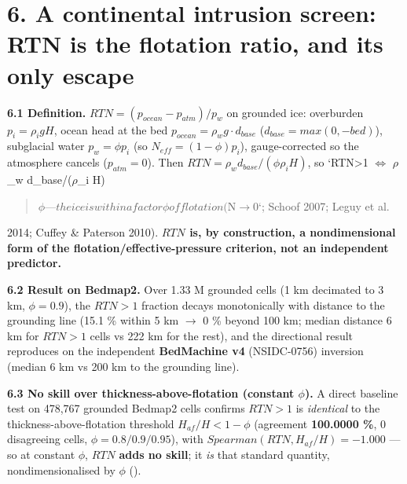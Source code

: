 \documentclass[11pt]{article}
\begin{document}
\section*{6. A continental intrusion screen: RTN is the flotation ratio, and its only escape}


\textbf{6.1 Definition.} $RTN = (p_{ocean} - p_{atm})/p_{w}$ on grounded ice: overburden $p_{i}=\rho _{i} g H$, ocean head at the bed $p_{ocean}=\rho _{w} g\cdot d_{base}$ ($d_{base}=max(0,-bed)$), subglacial water $p_{w}=\phi  p_{i}$ (so $N_{eff}=(1-\phi )p_{i}$), gauge-corrected so the atmosphere cancels ($p_{atm}=0$). Then $RTN = \rho _{w} d_{base}/(\phi  \rho _{i} H)$, so `RTN>1 \ensuremath{\iff} \ensuremath{\rho}\_w d\_base/(\ensuremath{\rho}\_i H)

\begin{quote}
\ensuremath{\phi}$ — the ice is within a factor $\ensuremath{\phi}$ of flotation ($N\ensuremath{\to}0`; Schoof 2007; Leguy et al.
\end{quote}

2014; Cuffey \& Paterson 2010). \textbf{$RTN$ is, by construction, a nondimensional form of the flotation/effective-pressure criterion, not an independent predictor.}


\textbf{6.2 Result on Bedmap2.} Over 1.33 M grounded cells (1 km decimated to 3 km, $\phi =0.9$), the $RTN>1$ fraction decays monotonically with distance to the grounding line (15.1 \% within 5 km \ensuremath{\to} 0 \% beyond 100 km; median distance 6 km for $RTN>1$ cells vs 222 km for the rest), and the directional result reproduces on the independent \textbf{BedMachine v4} (NSIDC-0756) inversion (median 6 km vs 200 km to the grounding line).


\textbf{6.3 No skill over thickness-above-flotation (constant $\phi $).} A direct baseline test on 478,767 grounded Bedmap2 cells confirms ${RTN>1}$ is \emph{identical} to the thickness-above-flotation threshold ${H_{af}/H<1-\phi }$ (agreement \textbf{100.0000 \%}, 0 disagreeing cells, $\phi =0.8/0.9/0.95$), with $Spearman(RTN, H_{af}/H)=-1.000$ — so at constant $\phi $, $RTN$ \textbf{adds no skill}; it \emph{is} that standard quantity, nondimensionalised by $\phi $ ().
\end{document}
